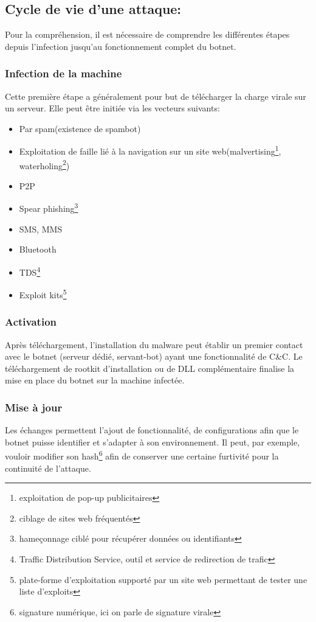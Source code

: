 

\subsection{Cycle de vie d'une attaque:}
\par Pour la compréhension, il est nécessaire de comprendre les différentes étapes depuis l'infection jusqu'au fonctionnement complet du botnet.

\subsubsection{Infection de la machine}
Cette première étape a généralement pour but de télécharger la charge virale sur un serveur.
Elle peut être initiée via les vecteurs suivants:
	 \begin{itemize}
		 \item Par spam(existence de spambot)
		 \item Exploitation de faille lié à la navigation sur un site web(malvertising\footnote{exploitation de pop-up publicitaires}, waterholing\footnote{ciblage de sites web fréquentés})
		 \item P2P
		 \item Spear phishing\footnote{hameçonnage ciblé pour récupérer données ou identifiants}
		 \item SMS, MMS
		 \item Bluetooth
		 \item TDS\footnote{Traffic Distribution Service, outil et service de redirection de trafic}
		 \item Exploit kits\footnote{plate-forme d'exploitation supporté par un site web permettant de tester une liste d'exploits}
	 \end{itemize}
	
\subsubsection{Activation}
Après téléchargement, l'installation du malware peut établir un premier contact avec le botnet (serveur dédié, servant-bot) ayant une fonctionnalité de C\&C.
Le téléchargement de rootkit d'installation ou de DLL complémentaire finalise la mise en place du botnet sur la machine infectée.	
	
\subsubsection{Mise à jour}
Les échanges permettent l'ajout de fonctionnalité, de configurations afin que le botnet puisse identifier et s'adapter à son environnement.
Il peut, par exemple, vouloir modifier son hash\footnote{signature numérique, ici on parle de signature virale} afin de conserver une certaine furtivité pour la continuité de l'attaque.

